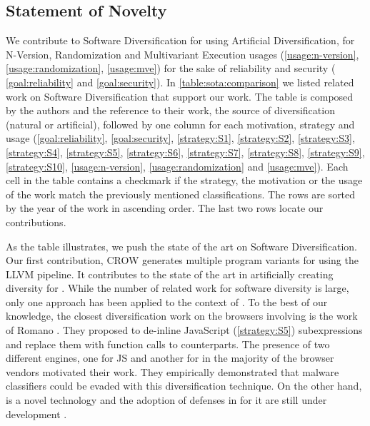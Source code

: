 \subsection*{Statement of Novelty}



We contribute to Software Diversification for \wasm using Artificial Diversification, for N-Version, Randomization and Multivariant Execution usages (\autoref{usage:n-version}, \autoref{usage:randomization}, \autoref{usage:mve}) for the sake of reliability and security ( \autoref{goal:reliability} and \autoref{goal:security}). In \autoref{table:sota:comparison} we listed related work on Software Diversification that support our work. The table is composed by the authors and the reference to their work, the source of diversification (natural or artificial), followed by one column for each motivation, strategy and usage (\autoref{goal:reliability},  \autoref{goal:security},  \autoref{strategy:S1},  \autoref{strategy:S2},  \autoref{strategy:S3},  \autoref{strategy:S4},  \autoref{strategy:S5},  \autoref{strategy:S6},  \autoref{strategy:S7},  \autoref{strategy:S8},  \autoref{strategy:S9}, \autoref{strategy:S10}, \autoref{usage:n-version}, \autoref{usage:randomization} and \autoref{usage:mve}). Each cell in the table contains a checkmark if the strategy, the motivation or the usage of the work match the previously mentioned classifications. The rows are sorted by the year of the work in ascending order. The last two rows locate our contributions. 



As the table illustrates, we push the state of the art on Software Diversification. Our first contribution, CROW \cite{CROW} generates multiple program variants for \wasm using the LLVM pipeline.
It contributes to the state of the art in artificially creating diversity for \wasm. While the number of related work for software diversity is large, only one approach has been applied to the context of \wasm. To the best of our knowledge, the closest diversification work on the browsers involving \wasm is the work of Romano \etal \cite{wobfuscator}. They proposed to de-inline JavaScript (\autoref{strategy:S5}) subexpressions and replace them with function calls to \wasm counterparts. The presence of two different engines, one for JS and another for \wasm in the majority of the browser vendors motivated their work. They empirically demonstrated that malware classifiers could be evaded with this diversification technique. On the other hand, \wasm is a novel technology and the adoption of defenses in for it are still under development \cite{Narayan2021Swivel, johnson2021}.

